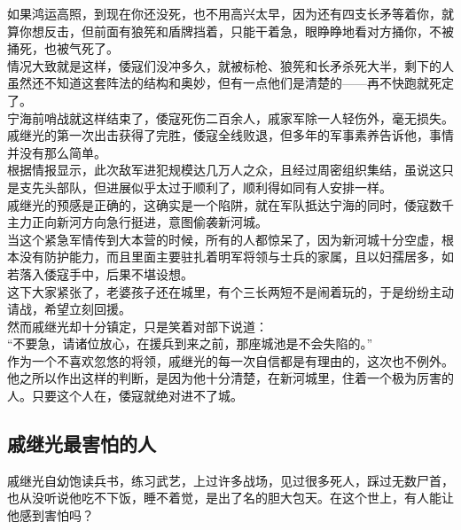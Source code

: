\begin{multicols}{\theparacolNo}
如果鸿运高照，到现在你还没死，也不用高兴太早，因为还有四支长矛等着你，就算你想反击，但前面有狼筅和盾牌挡着，只能干着急，眼睁睁地看对方捅你，不被捅死，也被气死了。\\

情况大致就是这样，倭寇们没冲多久，就被标枪、狼筅和长矛杀死大半，剩下的人虽然还不知道这套阵法的结构和奥妙，但有一点他们是清楚的——再不快跑就死定了。\\

宁海前哨战就这样结束了，倭寇死伤二百余人，戚家军除一人轻伤外，毫无损失。\\

戚继光的第一次出击获得了完胜，倭寇全线败退，但多年的军事素养告诉他，事情并没有那么简单。\\

根据情报显示，此次敌军进犯规模达几万人之众，且经过周密组织集结，虽说这只是支先头部队，但进展似乎太过于顺利了，顺利得如同有人安排一样。\\

戚继光的预感是正确的，这确实是一个陷阱，就在军队抵达宁海的同时，倭寇数千主力正向新河方向急行挺进，意图偷袭新河城。\\

当这个紧急军情传到大本营的时候，所有的人都惊呆了，因为新河城十分空虚，根本没有防护能力，而且里面主要驻扎着明军将领与士兵的家属，且以妇孺居多，如若落入倭寇手中，后果不堪设想。\\

这下大家紧张了，老婆孩子还在城里，有个三长两短不是闹着玩的，于是纷纷主动请战，希望立刻回援。\\

然而戚继光却十分镇定，只是笑着对部下说道：\\

“不要急，请诸位放心，在援兵到来之前，那座城池是不会失陷的。”\\

作为一个不喜欢忽悠的将领，戚继光的每一次自信都是有理由的，这次也不例外。他之所以作出这样的判断，是因为他十分清楚，在新河城里，住着一个极为厉害的人。只要这个人在，倭寇就绝对进不了城。\\

\subsection{戚继光最害怕的人}
戚继光自幼饱读兵书，练习武艺，上过许多战场，见过很多死人，踩过无数尸首，也从没听说他吃不下饭，睡不着觉，是出了名的胆大包天。在这个世上，有人能让他感到害怕吗？\\


\end{multicols}
